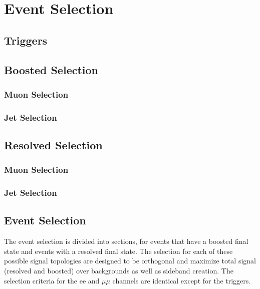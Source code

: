 \chapter{Event Selection}
\label{ch:event_selection}

\section{Triggers}
\label{sec:triggers}

\section{Boosted Selection}

\subsection{Muon Selection}

\subsection{Jet Selection}

\section{Resolved Selection}

\subsection{Muon Selection}

\subsection{Jet Selection}

\section{Event Selection}
\label{sec:selection}
The event selection is divided into sections, for events that have a boosted final state and events with a resolved final state.
The selection for each of these possible signal topologies are designed to be orthogonal and maximize total signal (resolved and boosted) over backgrounds as well as sideband creation. The selection criteria for the ee and $\mu\mu$ channels are identical except for the triggers.

